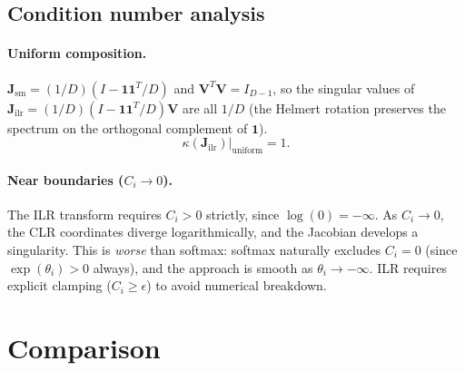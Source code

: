 \documentclass[11pt]{article}
\newcommand{\JJ}{\mathbf{J}}
\newcommand{\VV}{\mathbf{V}}
\newcommand{\ones}{\mathbf{1}}
\begin{document}
\subsection{Condition number analysis}

\paragraph{Uniform composition.}
$\JJ_\mathrm{sm} = (1/D)(I - \ones\ones^T/D)$ and $\VV^T\VV = I_{D-1}$,
so the singular values of $\JJ_\mathrm{ilr} = (1/D)(I - \ones\ones^T/D)\VV$
are all $1/D$ (the Helmert rotation preserves the spectrum on the
orthogonal complement of $\ones$).
%
\begin{equation}
  \kappa(\JJ_\mathrm{ilr})\big|_\mathrm{uniform} = 1.
\end{equation}

\paragraph{Near boundaries ($C_i \to 0$).}
The ILR transform requires $C_i > 0$ strictly, since $\log(0) = -\infty$.
As $C_i \to 0$, the CLR coordinates diverge logarithmically, and the
Jacobian develops a singularity.  This is \emph{worse} than softmax:
softmax naturally excludes $C_i = 0$ (since $\exp(\theta_i) > 0$ always),
and the approach is smooth as $\theta_i \to -\infty$.  ILR requires
explicit clamping ($C_i \ge \epsilon$) to avoid numerical breakdown.



\section{Comparison}
\label{sec:comparison}
\end{document}
